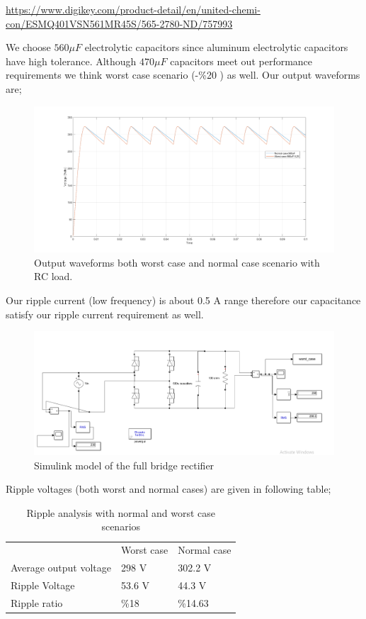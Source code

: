 \documentclass[fleqn, a4paper]{article}
\begin{document}
\url{https://www.digikey.com/product-detail/en/united-chemi-con/ESMQ401VSN561MR45S/565-2780-ND/757993}

We choose $560 \mu F $ electrolytic capacitors since aluminum electrolytic capacitors have high tolerance. Although $470 \mu F $ capacitors meet out performance requirements we think worst case scenario (-\%20 ) as well. Our output waveforms are;
\begin{figure}[H]
  \includegraphics[width=\linewidth]{RC_load.png}
  \caption{Output waveforms both worst case and normal case scenario with RC load.}
  \label{fig:simulink2}
\end{figure}
Our ripple current (low frequency) is about 0.5 A range therefore our capacitance satisfy our ripple current requirement as well. 

\begin{figure}[H]
  \includegraphics[width=\linewidth]{Simulink_modelRC_load.PNG}
  \caption{Simulink model of the full bridge rectifier}
  \label{fig:simulink3}
\end{figure}
Ripple voltages (both worst and normal cases) are given in following table;

\begin{table}[H]
\centering
\begin{tabular}{lll}
                       & Worst case & Normal case \\
Average output voltage & 298 V      & 302.2 V     \\
Ripple Voltage         & 53.6 V     & 44.3 V      \\
Ripple ratio           & \%18       & \%14.63    
\end{tabular}
\caption{Ripple analysis with normal and worst case scenarios}
\end{table}
\end{document}
